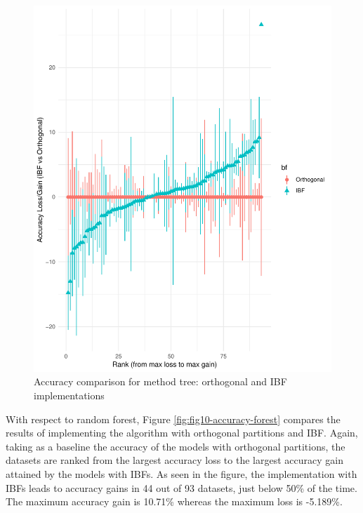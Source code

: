 \documentclass[]{elsarticle} %
\makeatletter
\def\maxwidth{\ifdim\Gin@nat@width>\linewidth\linewidth
\else\Gin@nat@width\fi}
\let\Oldincludegraphics\includegraphics
\renewcommand{\includegraphics}[1]{\Oldincludegraphics[width=\maxwidth]{#1}}
\makeatother
\begin{document}
\begin{figure}
\centering
\includegraphics{Trees_with_Base_Functions_v3_files/figure-latex/fig9-accuracy-tree-1.pdf}
\caption{\label{fig:fig9-accuracy-tree}Accuracy comparison for method
tree: orthogonal and IBF implementations}
\end{figure}

With respect to random forest, Figure \ref{fig:fig10-accuracy-forest}
compares the results of implementing the algorithm with orthogonal
partitions and IBF. Again, taking as a baseline the accuracy of the
models with orthogonal partitions, the datasets are ranked from the
largest accuracy loss to the largest accuracy gain attained by the
models with IBFs. As seen in the figure, the implementation with IBFs
leads to accuracy gains in 44 out of 93 datasets, just below 50\% of the
time. The maximum accuracy gain is 10.71\% whereas the maximum loss is
-5.189\%.
\end{document}
